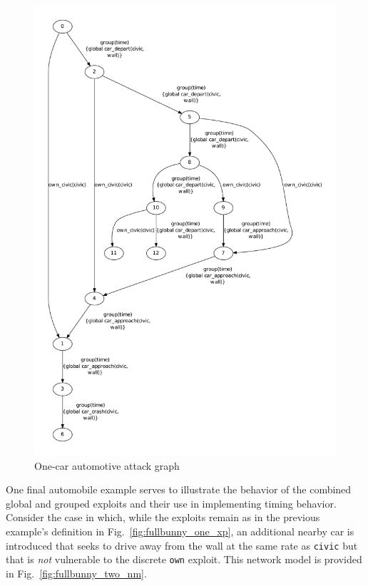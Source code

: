 \begin{figure}
\includegraphics[width=6in]{ag_car/onecar/full_bunny_onecar_ag_5}
\caption{One-car automotive attack graph}
\label{fig:fullbunny_one_ag}
\end{figure}

One final automobile example serves to illustrate the behavior of the
combined global and grouped exploits and their use in implementing
timing behavior. Consider the case in which, while the exploits remain
as in the previous example's definition in Fig.~\ref{fig:fullbunny_one_xp},
an additional nearby car is introduced that seeks to drive away from the wall
at the same rate as \texttt{civic} but that is \emph{not} vulnerable to the 
discrete \texttt{own} exploit. This network model is provided in 
Fig.~\ref{fig:fullbunny_two_nm}.

